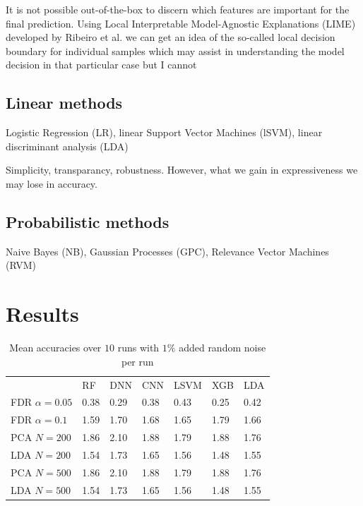 \documentclass[a4paper,10pt]{article}
\begin{document}

It is not possible out-of-the-box to discern which features are important for the final prediction. 
Using Local Interpretable Model-Agnostic Explanations (LIME) developed by Ribeiro et al.\cite{Ribeiro2016} 
we can get an idea of the so-called local decision boundary for individual samples which may assist in
understanding the model decision in that particular case but I cannot 
%
\subsection{Linear methods}

Logistic Regression (LR), 
linear Support Vector Machines (lSVM), 
linear discriminant analysis (LDA)

Simplicity, transparancy, robustness. However, what we gain in expressiveness we may lose in accuracy.

\subsection{Probabilistic methods}
%
Naive Bayes (NB), Gaussian Processes (GPC), Relevance Vector Machines (RVM)


\section{Results}
% 
\begin{table}[htp]
\centering
\caption{Mean accuracies over $10$ runs with $1\%$ added random noise per run}
\label{tab:diversitymetrics}
\begin{tabular}{lllllll}
				& RF     & DNN 		& CNN  		& LSVM 		& 	XGB 	& 	LDA  \\
FDR $\alpha=0.05$		& 0.38   &  0.29      	&  0.38     	&  0.43    	& 0.25    	& 0.42  \\
FDR $\alpha=0.1$ 		& 1.59   &  1.70      	&  1.68 	&  1.65    	& 1.79    	& 1.66  \\
PCA $N=200$    			& 1.86   &  2.10      	&  1.88         &  1.79    	& 1.88          & 1.76  \\
LDA $N=200$        		& 1.54   &  1.73      	&  1.65         &  1.56    	& 1.48          & 1.55  \\
PCA $N=500$    			& 1.86   &  2.10      	&  1.88         &  1.79    	& 1.88          & 1.76  \\
LDA $N=500$        		& 1.54   &  1.73      	&  1.65         &  1.56    	& 1.48          & 1.55  \\
\end{tabular}
\end{table}
%
\end{document}
